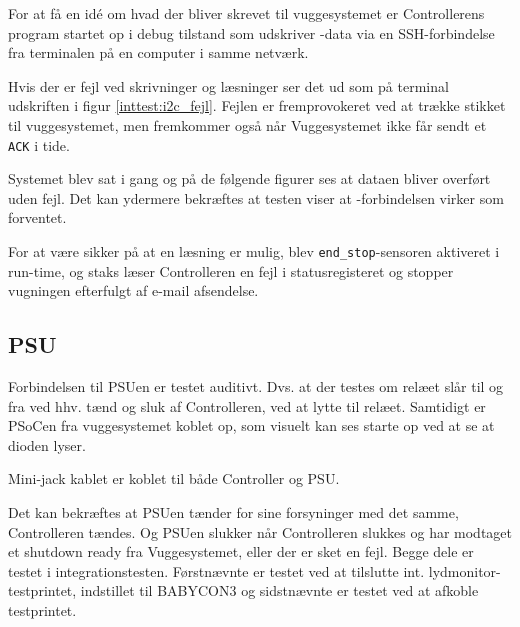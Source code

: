 
For at få en idé om hvad der bliver skrevet til vuggesystemet er Controllerens program startet op i debug tilstand som udskriver \iic-data via en SSH-forbindelse fra terminalen på en computer i samme netværk. 

Hvis der er fejl ved \iic skrivninger og læsninger ser det ud som på terminal udskriften i figur \ref{inttest:i2c_fejl}. Fejlen er fremprovokeret ved at trække stikket til vuggesystemet, men fremkommer også når Vuggesystemet ikke får sendt et \verb+ACK+ i tide.

Systemet blev sat i gang og på de følgende figurer ses at \iic dataen bliver overført uden fejl. Det kan ydermere bekræftes at testen viser at \iic-forbindelsen virker som forventet.


For at være sikker på at en \iic læsning er mulig, blev \verb+end_stop+-sensoren aktiveret i run-time, og staks læser Controlleren en fejl i statusregisteret og stopper vugningen efterfulgt af e-mail afsendelse.

\subsection*{PSU}

Forbindelsen til PSUen er testet auditivt. Dvs. at der testes om relæet slår til og fra ved hhv. tænd og sluk af Controlleren, ved at lytte til relæet. Samtidigt er PSoCen fra vuggesystemet koblet op, som visuelt kan ses starte op ved at se at dioden lyser.

Mini-jack kablet er koblet til både Controller og PSU.


Det kan bekræftes at PSUen tænder for sine forsyninger med det samme, Controlleren tændes. Og PSUen slukker når Controlleren slukkes og har modtaget et shutdown ready fra Vuggesystemet, eller der er sket en fejl. Begge dele er testet i integrationstesten. Førstnævnte er testet ved at tilslutte int. lydmonitor-testprintet, indstillet til BABYCON3 og sidstnævnte er testet ved at afkoble testprintet. 

